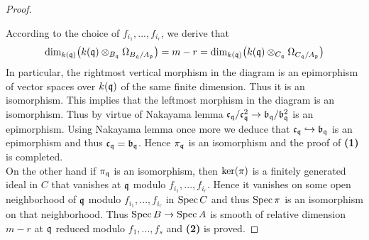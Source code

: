 \begin{proof}
\begin{center}
\end{center}
According to the choice of $f_{i_1},...,f_{i_r}$, we derive that
$$\mathrm{dim}_{k(\mathfrak{q})}\big(k(\mathfrak{q})\otimes_{B_{\mathfrak{q}}}\Omega_{B_{\mathfrak{q}}/A_{\mathfrak{p}}}\big) = m - r = \mathrm{dim}_{k(\mathfrak{q})}\big(k(\mathfrak{q})\otimes_{C_{\mathfrak{q}}}\Omega_{C_{\mathfrak{q}}/A_{\mathfrak{p}}}\big)$$
In particular, the rightmost vertical morphism in the diagram is an epimorphism of vector spaces over $k(\mathfrak{q})$ of the same finite dimension. Thus it is an isomorphism. This implies that the leftmost morphism in the diagram is an isomorphism. Thus by virtue of Nakayama lemma $\mathfrak{c}_{\mathfrak{q}}/\mathfrak{c}^2_{\mathfrak{q}}\rightarrow \mathfrak{b}_{\mathfrak{q}}/\mathfrak{b}^2_{\mathfrak{q}}$ is an epimorphism. Using Nakayama lemma once more we deduce that $\mathfrak{c}_{\mathfrak{q}} \hookrightarrow \mathfrak{b}_{\mathfrak{q}}$ is an epimorphism and thus $\mathfrak{c}_{\mathfrak{q}} = \mathfrak{b}_{\mathfrak{q}}$. Hence $\pi_{\mathfrak{q}}$ is an isomorphism and the proof of \textbf{(1)} is completed.\\
On the other hand if $\pi_{\mathfrak{q}}$ is an isomorphism, then $\mathrm{ker}(\pi)$ is a finitely generated ideal in $C$ that vanishes at $\mathfrak{q}$ modulo $f_{i_1},...,f_{i_r}$. Hence it vanishes on some open neighborhood of $\mathfrak{q}$ modulo $f_{i_1},...,f_{i_r}$ in $\mathrm{Spec}\, C$ and thus $\mathrm{Spec}\, \pi$ is an isomorphism on that neighborhood. Thus $\mathrm{Spec}\, B\rightarrow \mathrm{Spec}\, A$ is smooth of relative dimension $m-r$ at $\mathfrak{q}$ reduced modulo $f_1,...,f_s$ and \textbf{(2)} is proved.
\end{proof}

